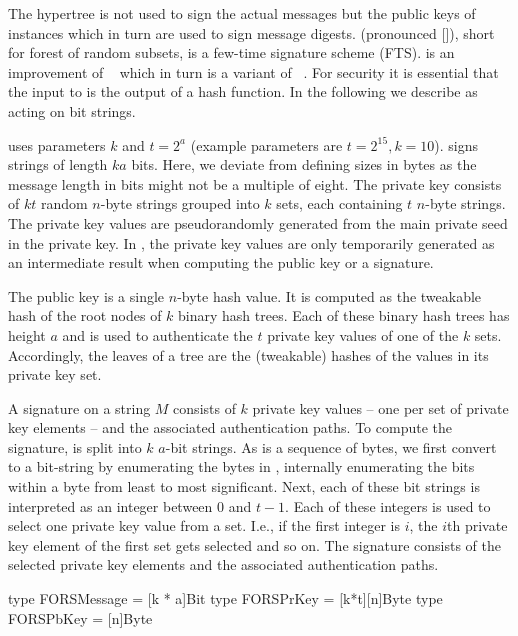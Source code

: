 The \spx hypertree \hyper is not used to sign the actual messages but the 
public keys of \fors instances which in turn are used to sign message digests. 
\fors (pronounced []), short for forest of random subsets, is a few-time 
signature scheme (FTS). \fors is an improvement of \horst~\cite{Bernstein2015} 
which in turn is a variant of \hors~\cite{Reyzin2002}. 
For security it is essential that the input to \fors is the output of a
hash function. In the following we describe \fors as acting on bit strings.


\fors uses parameters $k$ and $t=2^a$ (example parameters are $t=2^{15}, k=10$). 
\fors signs strings of length $ka$ bits. Here, we deviate from defining 
sizes in bytes as the message length in bits might not be a multiple of eight.
The private key consists of $kt$ 
random $n$-byte strings grouped
into $k$ sets, each containing $t$ $n$-byte strings. The private key values
are pseudorandomly generated from the main private seed \sseed in the \spx private
key. In \spx, the \fors private key values are only temporarily generated as an 
intermediate result when computing the public key or a signature. 

The \fors public key is a single $n$-byte hash value. It is computed as the 
tweakable hash of the root nodes of $k$ binary hash trees. Each of these binary 
hash trees has height $a$ and is used to authenticate the $t$ private key
values of one of the $k$ sets. Accordingly, the leaves of a tree are the 
(tweakable) hashes of the values in its private key set.

A signature on a string $M$ consists of $k$ private key values -- one per 
set of private key elements -- and the 
associated authentication paths. To compute the signature, \md is 
split into $k$ $a$-bit strings. As \md is a sequence of bytes,
we first convert to a bit-string by enumerating the bytes in \md,
internally enumerating the bits within a byte from least to most significant.
Next, each of these bit strings is 
interpreted as an integer between $0$ and $t-1$. Each of these integers is used to
select one private key value from a set. I.e., if the first integer is $i$, the
$i$th private key element of the first set gets selected and so on. The signature
consists of the selected private key elements and the associated authentication 
paths.

\begin{code}
  type FORSMessage = [k * a]Bit
  type FORSPrKey = [k*t][n]Byte
  type FORSPbKey = [n]Byte
\end{code}

